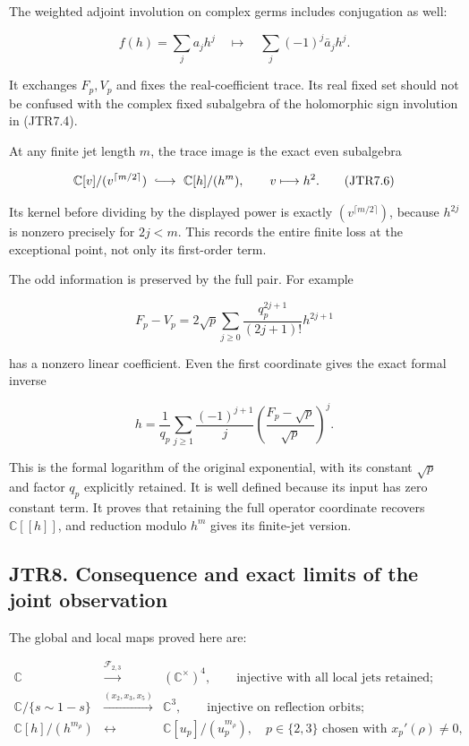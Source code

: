 \documentclass[
]{article}
\begin{document}
The weighted adjoint involution on complex germs includes conjugation as
well:

\[
f(h)=\sum_j a_jh^j
\quad\longmapsto\quad
\sum_j(-1)^j\bar a_jh^j.
\tag{JTR7.5}
\]

It exchanges \(F_p,V_p\) and fixes the real-coefficient trace. Its real
fixed set should not be confused with the complex fixed subalgebra of
the holomorphic sign involution in (JTR7.4).

At any finite jet length \(m\), the trace image is the exact even
subalgebra

\[
\mathbb C[v]/(v^{\lceil m/2\rceil})
\ \lhook\joinrel\longrightarrow\ 
\mathbb C[h]/(h^m),\qquad v\longmapsto h^2.
\tag{JTR7.6}
\]

Its kernel before dividing by the displayed power is exactly
\((v^{\lceil m/2\rceil})\), because \(h^{2j}\) is nonzero precisely for
\(2j<m\). This records the entire finite loss at the exceptional point,
not only its first-order term.

The odd information is preserved by the full pair. For example

\[
F_p-V_p=2\sqrt p\sum_{j\ge0}
\frac{q_p^{2j+1}}{(2j+1)!}h^{2j+1}
\tag{JTR7.7}
\]

has a nonzero linear coefficient. Even the first coordinate gives the
exact formal inverse

\[
\boxed{h=\frac1{q_p}
\sum_{j\ge1}\frac{(-1)^{j+1}}j
\left(\frac{F_p-\sqrt p}{\sqrt p}\right)^j.}
\tag{JTR7.8}
\]

This is the formal logarithm of the original exponential, with its
constant \(\sqrt p\) and factor \(q_p\) explicitly retained. It is well
defined because its input has zero constant term. It proves that
retaining the full operator coordinate recovers \(\mathbb C[[h]]\), and
reduction modulo \(h^m\) gives its finite-jet version.

\subsection{JTR8. Consequence and exact limits of the joint
observation}\label{jtr8.-consequence-and-exact-limits-of-the-joint-observation}

The global and local maps proved here are:

\[
\begin{array}{rcl}
\mathbb C&\xrightarrow{\mathcal F_{2,3}}&
(\mathbb C^\times)^4,
\qquad\text{injective with all local jets retained};\\
\mathbb C/\{s\sim1-s\}&\xrightarrow{(x_2,x_3,x_5)}&
\mathbb C^3,
\qquad\text{injective on reflection orbits};\\
\mathbb C[h]/(h^{m_\rho})&\longleftrightarrow&
\mathbb C[u_p]/(u_p^{m_\rho}),
\quad p\in\{2,3\}\text{ chosen with }x_p'(\rho)\ne0,
\end{array}
\tag{JTR8.1}
\]
\end{document}
